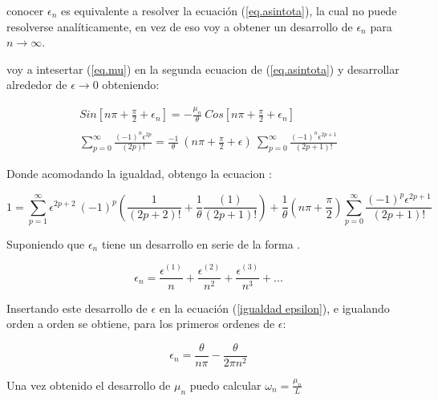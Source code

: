 conocer $\epsilon _n $ es equivalente a resolver la ecuación (\ref{eq.asintota}), la cual no puede resolverse analíticamente, en vez de eso voy a obtener un desarrollo de $\epsilon _n $ para $n \rightarrow \infty$.

voy a intesertar (\ref{eq.mu}) en la segunda ecuacion de (\ref{eq.asintota}) y desarrollar alrededor de $\epsilon \rightarrow{0}$ obteniendo:

\begin{equation}
\begin{array}{c}
    Sin[ n \pi + \frac{\pi}{2} + \epsilon _n ] = 
    - \frac{\mu _n}{\theta}  \ Cos[ n \pi + \frac{\pi}{2} + \epsilon _n ]  \\
 \\

         \sum _{p=0} ^{\infty} \frac{(-1) ^n  \epsilon ^{2 p }}{(2p)!} 
    =  \frac{-1}{\theta}  \ (n \pi + \frac{\pi}{2} + \epsilon ) \
     \sum _{p=0} ^{\infty} \frac{(-1) ^n \epsilon ^{2 p + 1}}{(2p+1)!} 
\end{array}
\end{equation}


Donde acomodando la igualdad, obtengo la ecuacion :

\begin{equation}
    1 = \sum _{p=1} ^{\infty} \epsilon ^{2p+2} \ (-1) ^p
    \left( 
    \frac{1}{(2p+2)!} + \frac{1}{\theta} \frac{(1 )}{(2p+1)!} 
    \right ) +
    \frac{1}{\theta} \left(n \pi + \frac{\pi}{2} \right)
    \sum _{p=0} ^{\infty} \frac{(-1) ^p \epsilon ^{2p+1}}{(2p+1) !}
\label{igualdad epsilon}
\end{equation}

Suponiendo que $\epsilon _n $ tiene un desarrollo en serie de la forma .

\begin{equation}
    \epsilon _n = 
    \frac{\epsilon ^{(1)}}{n}  + 
    \frac{\epsilon ^{(2)}}{n ^2}  + 
    \frac{\epsilon ^{(3)}}{n ^3}  + ...
\label{eq.epsilon}
\end{equation}


Insertando este desarrollo de $\epsilon$ en la ecuación (\ref{igualdad epsilon}), e igualando orden a orden se obtiene, para los primeros ordenes de $\epsilon$:

\begin{equation}
    \epsilon _n = \frac{\theta}{n \pi} 
     - \frac{ \theta}{2 \pi n ^2 } 
\label{epsilons}
\end{equation}

Una vez obtenido el desarrollo de $\mu _n $ puedo calcular $\omega _n = \frac{\mu _n }{L}  $ 



